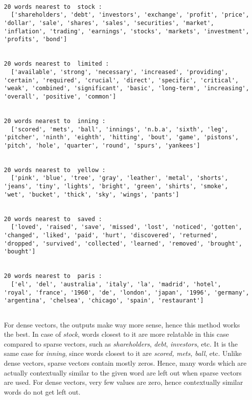 \documentclass[11pt]{article}
\begin{document}
    \begin{Verbatim}[commandchars=\\\{\}]

20 words nearest to  stock :
  ['shareholders', 'debt', 'investors', 'exchange', 'profit', 'price', 'dollar', 'sale', 'shares', 'sales', 'securities', 'market', 'inflation', 'trading', 'earnings', 'stocks', 'markets', 'investment', 'profits', 'bond'] 


20 words nearest to  limited :
  ['available', 'strong', 'necessary', 'increased', 'providing', 'certain', 'required', 'crucial', 'direct', 'specific', 'critical', 'weak', 'combined', 'significant', 'basic', 'long-term', 'increasing', 'overall', 'positive', 'common'] 


20 words nearest to  inning :
  ['scored', 'mets', 'ball', 'innings', 'n.b.a', 'sixth', 'leg', 'pitcher', 'ninth', 'eighth', 'hitting', 'bout', 'game', 'pistons', 'pitch', 'hole', 'quarter', 'round', 'spurs', 'yankees'] 


20 words nearest to  yellow :
  ['pink', 'blue', 'tree', 'gray', 'leather', 'metal', 'shorts', 'jeans', 'tiny', 'lights', 'bright', 'green', 'shirts', 'smoke', 'wet', 'bucket', 'thick', 'sky', 'wings', 'pants'] 


20 words nearest to  saved :
  ['loved', 'raised', 'save', 'missed', 'lost', 'noticed', 'gotten', 'changed', 'liked', 'paid', 'hurt', 'discovered', 'returned', 'dropped', 'survived', 'collected', 'learned', 'removed', 'brought', 'bought'] 


20 words nearest to  paris :
  ['el', 'del', 'australia', 'italy', 'la', 'madrid', 'hotel', 'royal', 'france', '1960', 'de', 'london', 'japan', '1996', 'germany', 'argentina', 'chelsea', 'chicago', 'spain', 'restaurant'] 


    \end{Verbatim}

    For dense vectors, the outputs make way more sense, hence this method
works the best. In case of \emph{stock}, words closest to it are more
relatable in this case compared to sparse vectors, such as
\emph{shareholders}, \emph{debt}, \emph{investors}, etc. It is the same
case for \emph{inning}, since words closest to it are \emph{scored,
mets, ball}, etc. Unlike dense vectors, sparse vectors contain mostly
zeros. Hence, many words which are actually contextually similar to the
given word are left out when sparse vectors are used. For dense vectors,
very few values are zero, hence contextually similar words do not get
left out.
\end{document}
